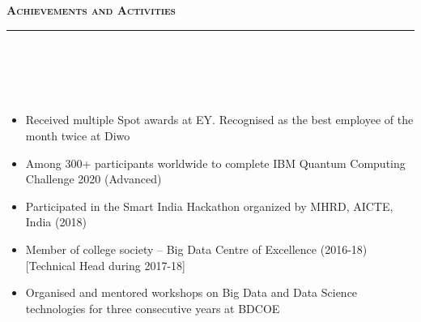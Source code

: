 \documentclass[a4paper,10pt]{article}
\newcommand{\isep}{-2 pt}
\newcommand{\lsep}{-0.5cm}
\newcommand{\resheading}[1]{{\small
        {
            \begin{minipage}
                {0.992\textwidth}\textbf{{\textsc{#1 \vphantom{p\^{E}} }}}
                \\[-0.3cm]
                \hrule
            \end{minipage}
            \\[-0.5cm]
        }
 }}
\begin{document}
\vspace{2pt}
\noindent
\resheading{\textbf{\large Achievements and Activities}}\\[\lsep] 
\\[-0.3cm]
\begin{itemize}\itemsep \isep

\item Received multiple Spot awards at EY. Recognised as the best employee of the month twice at Diwo

\item Among 300+ participants worldwide to complete IBM Quantum Computing Challenge 2020 (Advanced)

\item Participated in the Smart India Hackathon organized by MHRD, AICTE, India (2018)

\item Member of college society -- Big Data Centre of Excellence (2016-18) [Technical Head during  2017-18]

\item Organised and mentored workshops on Big Data and Data Science technologies for three consecutive years at BDCOE





    
	
\end{itemize}
\end{document}
